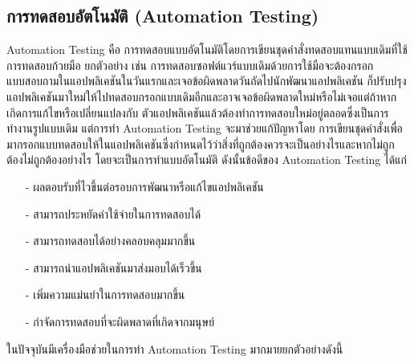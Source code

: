     \subsection{การทดสอบอัตโนมัติ (Automation Testing)}
        Automation Testing คือ การทดสอบแบบอัตโนมัติโดยการเขียนชุดคำสั่งทดสอบแทนแบบเดิมที่ใช้การทดสอบก้วยมือ ยกตัวอย่าง เช่น
        การทดสอบซอฟต์แวร์แบบเดิมด้วยการใช้มือจะต้องกรอกแบบสอบถามในแอปพลิเคชันในวันแรกและเจอข้อผิดพลาดวันถัดไปนักพัฒนาแอปพลิเคชัน
        ก็ปรับปรุงแอปพลิเคชันมาใหม่ให้ไปทดสอบกรอกแบบเดิมอีกและอาจเจอข้อผิดพลาดใหม่หรือไม่เจอแต่ถ้าหากเกิดการแก้ไขหรือเปลี่ยนแปลงกับ
        ตัวแอปพลิเคชันแล้วต้องทำการทดสอบใหม่อยู่ตลอดซึ่งเป็นการทำงานรูปแบบเดิม แต่การทำ Automation Testing จะมาช่วยแก้ปัญหาโดย
        การเขียนชุดคำสั่งเพื่อมากรอกแบบทดสอบให้ในแอปพลิเคชันซึ่งกำหนดไว้ว่าสิ่งที่ถูกต้องควรจะเป็นอย่างไรและหากไม่ถูกต้องไม่ถูกต้องอย่างไร
        โดยจะเป็นการทำแบบอัตโนมัติ ดังนั้นข้อดีของ Automation Testing ได้แก่
        \begin{itemize}
            \item[-] ผลตอบรับที่ไวขึ้นต่อรอบการพัฒนาหรือแก้ไขแอปพลิเคชัน
            \item[-] สามารถประหยัดค่าใช้จ่ายในการทดสอบได้
            \item[-] สามารถทดสอบได้อย่างคลอบคลุมมากขึ้น
            \item[-] สามารถนำแอปพลิเคชันมาส่งมอบได้เร็วขึ้น
            \item[-] เพิ่มความแม่นยำในการทดสอบมากขึ้น 
            \item[-] กำจัดการทดสอบที่จะผิดพลาดที่เกิดจากมนุษย์ 
        \end{itemize}
        ในปัจจุบันมีเครื่องมือช่วยในการทำ Automation Testing มากมายยกตัวอย่างดังนี้
